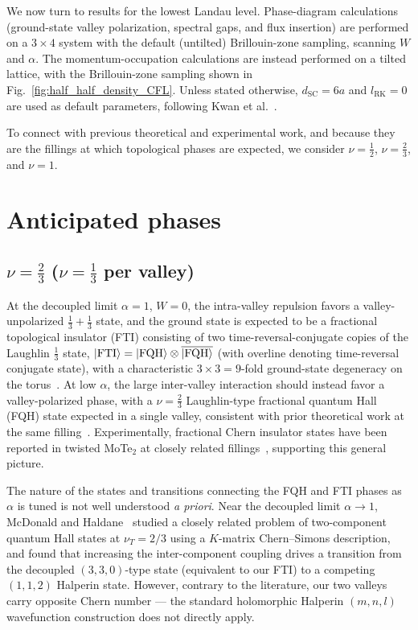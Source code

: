 We now turn to results for the lowest Landau level. Phase-diagram calculations (ground-state valley polarization, spectral gaps, and flux insertion) are performed on a $3\times4$ system with the default (untilted) Brillouin-zone sampling, scanning $W$ and $\alpha$. The momentum-occupation calculations are instead performed on a tilted lattice, with the Brillouin-zone sampling shown in Fig.~\ref{fig:half_half_density_CFL}. Unless stated otherwise, $d_{\text{SC}} = 6a$ and $l_{\text{RK}} = 0$ are used as default parameters, following Kwan et al.~\cite{kwan2024could}.

To connect with previous theoretical and experimental work, and because they are the fillings at which topological phases are expected, we consider $\nu = \tfrac{1}{2}$, $\nu = \tfrac{2}{3}$, and $\nu = 1$.

\section{Anticipated phases}

\subsection{\texorpdfstring{$\nu = \frac{2}{3}$}{nu = 2/3} (\texorpdfstring{$\nu=\frac{1}{3}$}{nu = 1/3} per valley)}

At the decoupled limit $\alpha = 1$, $W=0$, the intra-valley repulsion favors a valley-unpolarized $\tfrac{1}{3} + \tfrac{1}{3}$ state, and the ground state is expected to be a fractional topological insulator (FTI) consisting of two time-reversal-conjugate copies of the Laughlin $\tfrac{1}{3}$ state, $\ket{\text{FTI}} = \ket{\text{FQH}} \otimes \overline{\ket{\text{FQH}}}$ (with overline denoting time-reversal conjugate state), with a characteristic $3\times 3 = 9$-fold ground-state degeneracy on the torus~\cite{chen2012interaction}. At low $\alpha$, the large inter-valley interaction should instead favor a valley-polarized phase, with a $\nu = \tfrac{2}{3}$ Laughlin-type fractional quantum Hall (FQH) state expected in a single valley, consistent with prior theoretical work at the same filling~\cite{crepel2023anomalous}. Experimentally, fractional Chern insulator states have been reported in twisted MoTe$_2$ at closely related fillings~\cite{cai2023signatures, xu2023observation, zeng2023thermodynamic, park2023observation}, supporting this general picture.

The nature of the states and transitions connecting the FQH and FTI phases as $\alpha$ is tuned is not well understood \emph{a priori}. Near the decoupled limit $\alpha \to 1$, McDonald and Haldane~\cite{mcdonald1996topological} studied a closely related problem of two-component quantum Hall states at $\nu_T = 2/3$ using a $K$-matrix Chern--Simons description, and found that increasing the inter-component coupling drives a transition from the decoupled $(3,3,0)$-type state (equivalent to our FTI) to a competing $(1,1,2)$ Halperin state. However, contrary to the literature, our two valleys carry opposite Chern number --- the standard holomorphic Halperin $(m,n,l)$ wavefunction construction does not directly apply. %

